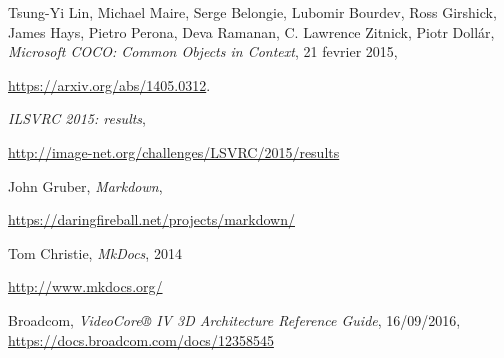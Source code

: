 \begin{thebibliography}{9}
		Tsung-Yi Lin, Michael Maire, Serge Belongie, Lubomir Bourdev, Ross Girshick, James Hays, Pietro Perona, Deva Ramanan, C. Lawrence Zitnick, Piotr Dollár,
		\emph{Microsoft COCO: Common Objects in Context},
		21 fevrier 2015,
		\par
		\url{https://arxiv.org/abs/1405.0312}.

		\emph{ILSVRC 2015: results},
		\par
		\url{http://image-net.org/challenges/LSVRC/2015/results}
		
		John Gruber,
		\emph{Markdown},
		\par
		\url{https://daringfireball.net/projects/markdown/}

		Tom Christie,
		\emph{MkDocs},
		2014
		\par
		\url{http://www.mkdocs.org/}

		Broadcom,
		\emph{VideoCore® IV 3D Architecture Reference Guide},
		16/09/2016,
		\url{https://docs.broadcom.com/docs/12358545}

\end{thebibliography}
